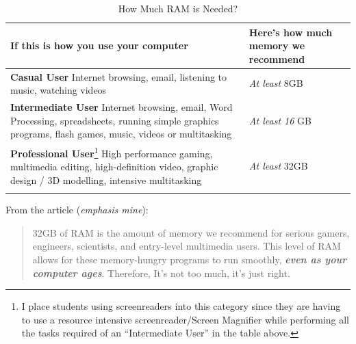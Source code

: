 \documentclass[14pt, letterpaper,twoside]{extreport}
\begin{document}
\begin{longtable}[]{@{}
	>{\raggedright\arraybackslash}p{}
	>{\raggedright\arraybackslash}p{}@{}
	}
	\toprule\noalign{}

	\textbf{If this is how you use your computer}                                                                                                                                                                                                                                                                                                                                                         & \textbf{Here's how much memory we recommend} \\
	\midrule\noalign{}
	\endhead
	\bottomrule\noalign{}
	\endlastfoot
	\textbf{Casual User} \break Internet browsing, email, listening to music, watching videos                                                                                                                                                                                                                                                                                                             & \emph{At least} 8GB                          \\[1.5em]
	\textbf{Intermediate User} \break Internet browsing, email, Word Processing, spreadsheets, running simple graphics programs, flash games, music, videos or multitasking                                                                                                                                                                                                                               & \emph{At least 16} GB                        \\[1.5em]
	\textbf{Professional User}\footnote{I place students using screenreaders into this category since they are having to use a resource intensive screenreader/Screen Magnifier while performing all the tasks required of an ``Intermediate User'' in the table above.} \break High performance gaming, multimedia editing, high-definition video, graphic design / 3D modelling, intensive multitasking & \emph{At least} 32GB                         \\[1.5em] \hline
	\caption{How Much RAM is Needed?}
\end{longtable}


From the article (\emph{emphasis mine}):
\begin{quote}
	32GB of RAM is the amount of memory we recommend for serious gamers, engineers, scientists, and entry-level multimedia users. This level of RAM allows for these memory-hungry programs to run smoothly, \textbf{\emph{even as your computer ages}}. Therefore, It's not too much, it's just right.
\end{quote}
\end{document}
